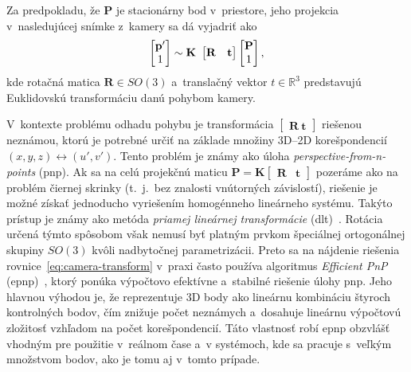       Za predpokladu, že $\mathbf P$ je stacionárny bod v~priestore, jeho projekcia v~nasledujúcej snímke z~kamery sa dá vyjadriť ako
      \begin{equation}
        \begin{bmatrix}
          \bf p' \\ 1
        \end{bmatrix} \sim
        \bf K~
        \begin{bmatrix}
          \bf R & \bf t
        \end{bmatrix}
        \begin{bmatrix}
          \bf P \\ 1
        \end{bmatrix},
        \label{eq:camera-transform}
      \end{equation}
      kde rotačná matica $\mathbf R \in SO(3)$ a~translačný vektor $t \in \mathbb{R}^3$ predstavujú Euklidovskú transformáciu danú pohybom kamery.

      V~kontexte problému odhadu pohybu je transformácia $\begin{bmatrix} \mathbf{R}\ \mathbf{t} \end{bmatrix}$ riešenou neznámou, ktorú je potrebné určiť na základe množiny 3D--2D korešpondencií $(x, y, z) \leftrightarrow (u', v')$. Tento problém je známy ako úloha \emph{perspective-from-n-points} (\acrshort{pnp}). Ak sa na celú projekčnú maticu $\mathbf{P} = \mathbf{K} \begin{bmatrix} \mathbf{R} & \mathbf{t} \end{bmatrix}$ pozeráme ako na problém čiernej skrinky (t.\ j.\ bez znalosti vnútorných závislostí), riešenie je možné získať jednoducho vyriešením homogénneho lineárneho systému. Takýto prístup je známy ako metóda \emph{priamej lineárnej transformácie} (\acrshort{dlt})~\cite{chienWhenUseWhat2016}. Rotácia určená týmto spôsobom však nemusí byť platným prvkom špeciálnej ortogonálnej skupiny $SO(3)$ kvôli nadbytočnej parametrizácii. Preto sa na nájdenie riešenia rovnice~\ref{eq:camera-transform} v~praxi často používa algoritmus \emph{Efficient PnP} (\acrshort{epnp})~\cite{lepetitEPnPAccurateSolution2009}, ktorý ponúka výpočtovo efektívne a~stabilné riešenie úlohy \acrshort{pnp}. Jeho hlavnou výhodou je, že reprezentuje 3D body ako lineárnu kombináciu štyroch kontrolných bodov, čím znižuje počet neznámych a~dosahuje lineárnu výpočtovú zložitosť vzhľadom na počet korešpondencií. Táto vlastnosť robí \acrshort{epnp} obzvlášť vhodným pre použitie v~reálnom čase a~v systémoch, kde sa pracuje s~veľkým množstvom bodov, ako je tomu aj v~tomto prípade.

